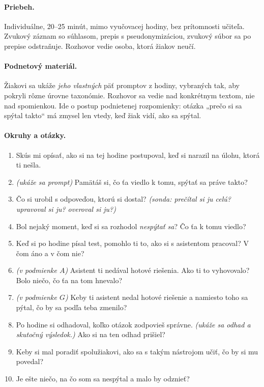 \paragraph{Priebeh.} Individuálne, 20--25 minút, mimo vyučovacej hodiny, bez prítomnosti učiteľa. Zvukový záznam so súhlasom, prepis s pseudonymizáciou, zvukový súbor sa po prepise odstraňuje. Rozhovor vedie osoba, ktorá žiakov neučí.

\paragraph{Podnetový materiál.} Žiakovi sa ukáže \emph{jeho vlastných} päť promptov z hodiny, vybraných tak, aby pokryli rôzne úrovne taxonómie. Rozhovor sa vedie nad konkrétnym textom, nie nad spomienkou. Ide o postup podnietenej rozpomienky: otázka „prečo si sa spýtal takto“ má zmysel len vtedy, keď žiak vidí, ako sa spýtal.

\paragraph{Okruhy a otázky.}
\begin{enumerate}[nosep, label=R\arabic*.]
    \item Skús mi opísať, ako si na tej hodine postupoval, keď si narazil na úlohu, ktorá ti nešla.
    \item \emph{(ukáže sa prompt)} Pamätáš si, čo ťa viedlo k tomu, spýtať sa práve takto?
    \item Čo si urobil s odpoveďou, ktorú si dostal? \emph{(sonda: prečítal si ju celú? upravoval si ju? overoval si ju?)}
    \item Bol nejaký moment, keď si sa rozhodol \emph{nespýtať sa}? Čo ťa k tomu viedlo?
    \item Keď si po hodine písal test, pomohlo ti to, ako si s asistentom pracoval? V čom áno a v čom nie?
    \item \emph{(v podmienke $A$)} Asistent ti nedával hotové riešenia. Ako ti to vyhovovalo? Bolo niečo, čo ťa na tom hnevalo?
    \item \emph{(v podmienke $G$)} Keby ti asistent nedal hotové riešenie a namiesto toho sa pýtal, čo by sa podľa teba zmenilo?
    \item Po hodine si odhadoval, koľko otázok zodpovieš správne. \emph{(ukáže sa odhad a skutočný výsledok.)} Ako si na ten odhad prišiel?
    \item Keby si mal poradiť spolužiakovi, ako sa s takým nástrojom učiť, čo by si mu povedal?
    \item Je ešte niečo, na čo som sa nespýtal a malo by odznieť?
\end{enumerate}

